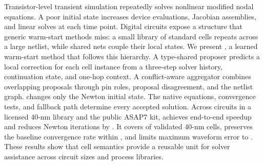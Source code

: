 Transistor-level transient simulation repeatedly solves nonlinear modified nodal equations. A poor initial state increases device evaluations, Jacobian assemblies, and linear solves at each time point. Digital circuits expose a structure that generic warm-start methods miss: a small library of standard cells repeats across a large netlist, while shared nets couple their local states. We present \system, a learned warm-start method that follows this hierarchy. A type-shared proposer predicts a local correction for each cell instance from a three-step solver history, continuation state, and one-hop context. A conflict-aware aggregator combines overlapping proposals through pin roles, proposal disagreement, and the netlist graph. \system changes only the Newton initial state. The native \spice{} equations, convergence tests, and fallback path determine every accepted solution. Across \NumTestCircuits{} circuits in a licensed 40-nm library and the public ASAP7 kit, \system achieves \HeadlineSpeedup{} end-to-end speedup and reduces Newton iterations by \NewtonReduction{}. It covers \CoverageForty{} of validated 40-nm cells, preserves the baseline convergence rate within \ConvergenceDelta{}, and limits maximum waveform error to \WaveformAbsError{}. These results show that cell semantics provide a reusable unit for solver assistance across circuit sizes and process libraries.

